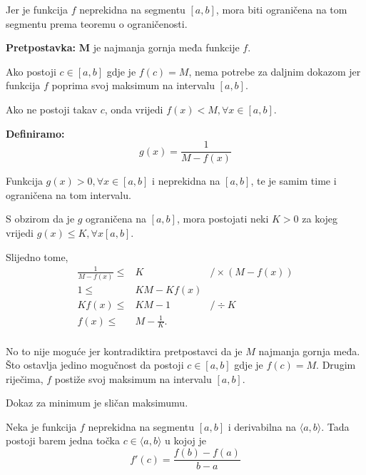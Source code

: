 Jer je funkcija $f$ neprekidna na segmentu $[a,b]$, mora biti ograničena na tom
segmentu prema teoremu o ograničenosti.

\textbf{Pretpostavka:} $\mathbf{M}$ je najmanja gornja međa funkcije $f$.

Ako postoji $c\in[a,b]$ gdje je $f(c)=M$, nema potrebe za daljnim dokazom jer
funkcija $f$ poprima svoj maksimum na intervalu $[a,b]$.

Ako ne postoji takav $c$, onda vrijedi $f(x)<M, \forall x\in [a,b]$.

\textbf{Definiramo:}
$$
g(x) = \frac{1}{M-f(x)}
$$

Funkcija $g(x)>0,\forall x \in [a,b]$ i neprekidna na $[a,b]$, te je samim time
i ograničena na tom intervalu.

S obzirom da je $g$ ograničena na $[a,b]$, mora postojati neki $K>0$ za kojeg
vrijedi $g(x)\leq K, \forall x [a,b]$.

Slijedno tome,
\begin{align*}
\frac{1}{M-f(x)}\leq& K&/\times(M-f(x))\\
1\leq& KM-Kf(x)\\
Kf(x)\leq& KM - 1&/\div K\\
f(x)\leq& M - \frac{1}{K}.\\
\end{align*}

No to nije moguće jer kontradiktira pretpostavci da je $M$ najmanja gornja međa.
Što ostavlja jedino mogučnost da postoji $c\in[a,b]$ gdje je $f(c)=M$.
Drugim riječima, $f$ postiže svoj maksimum na intervalu $[a,b]$.

Dokaz za minimum je sličan maksimumu.

\newpage
\begin{theorem}
    Neka je funkcija $f$ neprekidna na segmentu $[a,b]$ i derivabilna na $\langle a,b \rangle$.
    Tada postoji barem jedna točka $c\in\langle a,b \rangle$ u kojoj je
    $$
        f'(c) = \frac{f(b)-f(a)}{b-a}
    $$
\end{theorem}

